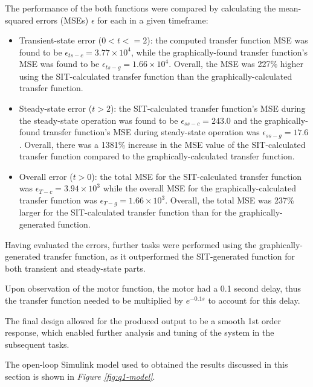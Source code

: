 \documentclass[11pt, onecolumn]{article}
\begin{document}
\par The performance of the both functions were compared by calculating the mean-squared errors (MSEs) $\epsilon$ for each in a given timeframe:
\begin{itemize}
    \item Transient-state error ($0 < t <= 2$): the computed transfer function MSE was found to be $\epsilon_{ts-c} = 3.77 \times 10^4$, while the graphically-found transfer function's MSE was found to be $\epsilon_{ts-g} = 1.66 \times 10^4$. Overall, the MSE was 227\% higher using the SIT-calculated transfer function than the graphically-calculated transfer function.
    \item Steady-state error ($t > 2$): the SIT-calculated transfer function's MSE during the steady-state operation was found to be $\epsilon_{ss-c} = 243.0$ and the graphically-found transfer function's MSE during steady-state operation was $\epsilon_{ss-g} = 17.6$. Overall, there was a 1381\% increase in the MSE value of the SIT-calculated transfer function compared to the graphically-calculated transfer function.
    \item Overall error ($t > 0$): the total MSE for the SIT-calculated transfer function was $\epsilon_{T-c}=3.94\times10^{3}$ while the overall MSE for the graphically-calculated transfer function was $\epsilon_{T-g}=1.66\times10^{3}$. Overall, the total MSE was 237\% larger for the SIT-calculated transfer function than for the graphically-generated function.
\end{itemize}
\par Having evaluated the errors, further tasks were performed using the graphically-generated transfer function, as it outperformed the SIT-generated function for both transient and steady-state parts.
\par Upon observation of the motor function, the motor had a 0.1 second delay, thus the transfer function needed to be multiplied by $e^{-0.1s}$ to account for this delay.
\par The final design allowed for the produced output to be a smooth 1st order response, which enabled further analysis and tuning of the system in the subsequent tasks.
\par The open-loop Simulink model used to obtained the results discussed in this section is shown in \textit{Figure \ref{fig:q1-model}}.\\
\end{document}

